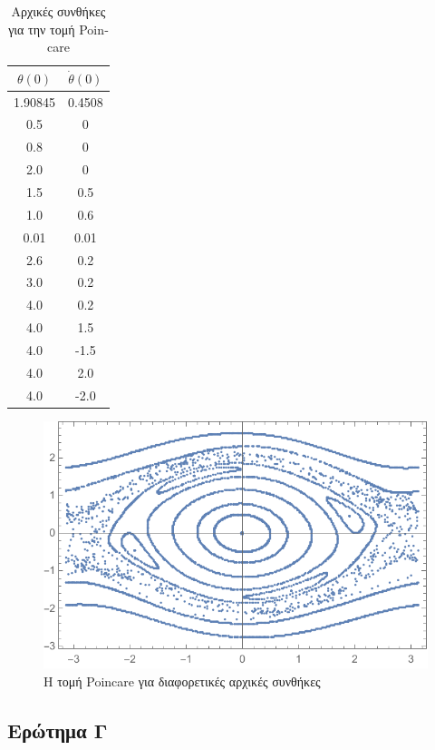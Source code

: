 \documentclass{article}
\begin{document}
\begin{table}[H]
\caption{Αρχικές συνθήκες για την τομή \textlatin{Poincare}}
\centering
\begin{tabular}{|c|c|}
\hline
\(\theta(0)\)  & \(\dot{\theta}(0)\) \\ \hline
1.90845 & 0.4508    \\ \hline
0.5     & 0         \\ \hline
0.8     & 0         \\ \hline
2.0     & 0         \\ \hline
1.5     & 0.5       \\ \hline
1.0     & 0.6       \\ \hline
0.01    & 0.01      \\ \hline
2.6     & 0.2       \\ \hline
3.0     & 0.2       \\ \hline
4.0     & 0.2       \\ \hline
4.0     & 1.5       \\ \hline
4.0     & -1.5      \\ \hline
4.0     & 2.0       \\ \hline
4.0     & -2.0       \\ \hline
\end{tabular}
\end{table}

\begin{figure}[H]
    \centering
    \includegraphics[]{AD_Pend_4/poincare.pdf}
    \caption{Η τομή \textlatin{Poincare} για διαφορετικές αρχικές συνθήκες}
    \label{fig:poincare_b}
\end{figure}

\subsection{Ερώτημα Γ}
\end{document}
